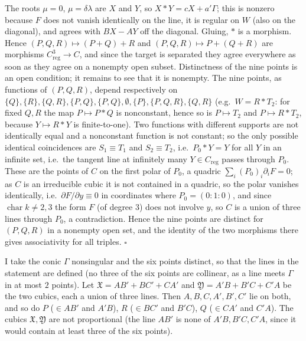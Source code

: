 \documentclass[11pt]{article}
\begin{document}
The roots $\mu=0$, $\mu=\delta\lambda$ are $X$ and $Y$, so $X*Y=cX+a'\Gamma$; this is nonzero because $F$ does not vanish identically on the line, it is regular on $W$ (also on the diagonal), and agrees with $BX-AY$ off the diagonal. Gluing, $*$ is a morphism. Hence $(P,Q,R)\mapsto(P+Q)+R$ and $(P,Q,R)\mapsto P+(Q+R)$ are morphisms $C_{\mathrm{reg}}^3\to C$, and since the target is separated they agree everywhere as soon as they agree on a nonempty open subset. Distinctness of the nine points is an open condition; it remains to see that it is nonempty. The nine points, as functions of $(P,Q,R)$, depend respectively on $\{Q\},\{R\},\{Q,R\},\{P,Q\},\{P,Q\},\emptyset,\{P\},\{P,Q,R\},\{Q,R\}$ (e.g.\ $W=R*T_2$: for fixed $Q,R$ the map $P\mapsto P*Q$ is nonconstant, hence so is $P\mapsto T_2$ and $P\mapsto R*T_2$, because $Y\mapsto R*Y$ is finite-to-one). Two functions with different supports are not identically equal and a nonconstant function is not constant; so the only possible identical coincidences are $S_1\equiv T_1$ and $S_2\equiv T_2$, i.e.\ $P_0*Y=Y$ for all $Y$ in an infinite set, i.e.\ the tangent line at infinitely many $Y\in C_{\mathrm{reg}}$ passes through $P_0$. These are the points of $C$ on the first polar of $P_0$, a quadric $\sum_i(P_0)_i\partial_iF=0$; as $C$ is an irreducible cubic it is not contained in a quadric, so the polar vanishes identically, i.e.\ $\partial F/\partial y\equiv0$ in coordinates where $P_0=(0:1:0)$, and since $\operatorname{char}k\ne2,3$ the form $F$ (of degree $3$) does not involve $y$, so $C$ is a union of three lines through $P_0$, a contradiction. Hence the nine points are distinct for $(P,Q,R)$ in a nonempty open set, and the identity of the two morphisms there gives associativity for all triples. \hfill$\square$

\pf
I take the conic $\Gamma$ nonsingular and the six points distinct, so that the lines in the statement are defined (no three of the six points are collinear, as a line meets $\Gamma$ in at most $2$ points). Let $\mathfrak X=AB'+BC'+CA'$ and $\mathfrak Y=A'B+B'C+C'A$ be the two cubics, each a union of three lines. Then $A,B,C,A',B',C'$ lie on both, and so do $P$ ($\in AB'$ and $A'B$), $R$ ($\in BC'$ and $B'C$), $Q$ ($\in CA'$ and $C'A$). The cubics $\mathfrak X,\mathfrak Y$ are not proportional (the line $AB'$ is none of $A'B,B'C,C'A$, since it would contain at least three of the six points).
\end{document}
